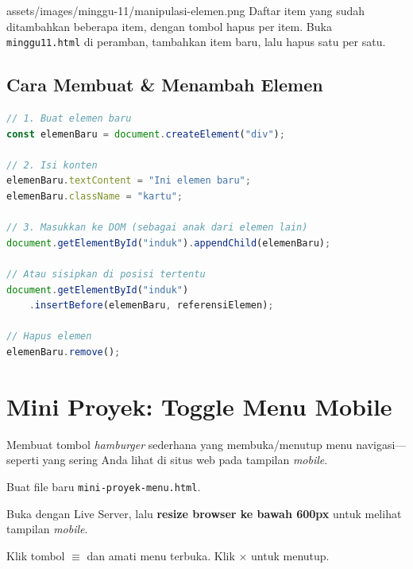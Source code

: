 \begin{tangkapanlayar}
  {assets/images/minggu-11/manipulasi-elemen.png}
  {Daftar item yang sudah ditambahkan beberapa item, dengan tombol hapus per item.}
  {Buka \texttt{minggu11.html} di peramban, tambahkan item baru, lalu hapus satu per satu.}
\end{tangkapanlayar}

\subsection{Cara Membuat \& Menambah Elemen}

\begin{lstlisting}[language=JavaScript, caption={Pola dasar pembuatan elemen DOM}, label={lst:11-pola-create}]
// 1. Buat elemen baru
const elemenBaru = document.createElement("div");

// 2. Isi konten
elemenBaru.textContent = "Ini elemen baru";
elemenBaru.className = "kartu";

// 3. Masukkan ke DOM (sebagai anak dari elemen lain)
document.getElementById("induk").appendChild(elemenBaru);

// Atau sisipkan di posisi tertentu
document.getElementById("induk")
    .insertBefore(elemenBaru, referensiElemen);

// Hapus elemen
elemenBaru.remove();
\end{lstlisting}

\section{Mini Proyek: Toggle Menu Mobile}
\label{sec:11-mini-proyek}

Membuat tombol \emph{hamburger} sederhana yang membuka/menutup menu navigasi---seperti yang sering Anda lihat di situs web pada tampilan \emph{mobile}.

\begin{langkah}
  \item Buat file baru \texttt{mini-proyek-menu.html}.
  \item Buka dengan Live Server, lalu \textbf{resize browser ke bawah 600px} untuk melihat tampilan \emph{mobile}.
  \item Klik tombol $\equiv$ dan amati menu terbuka. Klik $\times$ untuk menutup.
\end{langkah}

